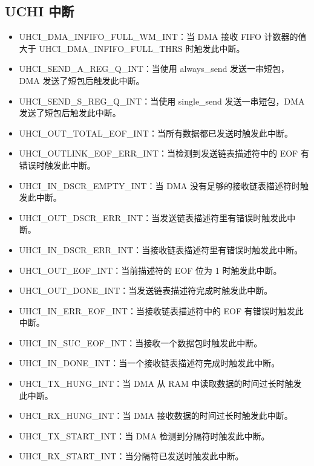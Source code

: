 \documentclass[main\_\_CN.tex]{subfiles}
\begin{document}
\subsection{UCHI 中断}
\begin{itemize}
\item \label{int:UHCIDMAINFIFOFULLWMINT}UHCI\_DMA\_INFIFO\_FULL\_WM\_INT：当 DMA 接收 FIFO 计数器的值大于 UHCI\_DMA\_INFIFO\_FULL\_THRS 时触发此中断。
\item \label{int:UHCISENDAREGQINT}UHCI\_SEND\_A\_REG\_Q\_INT：当使用 always\_send 发送一串短包，DMA 发送了短包后触发此中断。
\item \label{int:UHCISENDSREGQINT}UHCI\_SEND\_S\_REG\_Q\_INT：当使用 single\_send 发送一串短包，DMA 发送了短包后触发此中断。
\item \label{int:UHCIOUTTOTALEOFINT}UHCI\_OUT\_TOTAL\_EOF\_INT：当所有数据都已发送时触发此中断。
\item \label{int:UHCIOUTLINKEOFERRINT}UHCI\_OUTLINK\_EOF\_ERR\_INT：当检测到发送链表描述符中的 EOF 有错误时触发此中断。
\item \label{int:UHCIINDSCREMPTYINT}UHCI\_IN\_DSCR\_EMPTY\_INT：当 DMA 没有足够的接收链表描述符时触发此中断。
\item \label{int:UHCIOUTDSCRERRINT}UHCI\_OUT\_DSCR\_ERR\_INT：当发送链表描述符里有错误时触发此中断。
\item \label{int:UHCIINDSCRERRINT}UHCI\_IN\_DSCR\_ERR\_INT：当接收链表描述符里有错误时触发此中断。
\item \label{int:UHCIOUTEOFINT}UHCI\_OUT\_EOF\_INT：当前描述符的 EOF 位为 1 时触发此中断。
\item \label{int:UHCIOUTDONEINT}UHCI\_OUT\_DONE\_INT：当发送链表描述符完成时触发此中断。
\item \label{int:UHCIINERREOFINT}UHCI\_IN\_ERR\_EOF\_INT：当接收链表描述符中的 EOF 有错误时触发此中断。
\item \label{int:UHCIINSUCEOFINT}UHCI\_IN\_SUC\_EOF\_INT：当接收一个数据包时触发此中断。
\item \label{int:UHCIINDONEINT}UHCI\_IN\_DONE\_INT：当一个接收链表描述符完成时触发此中断。
\item \label{int:UHCITXHUNGINT}UHCI\_TX\_HUNG\_INT：当 DMA 从 RAM 中读取数据的时间过长时触发此中断。
\item \label{int:UHCIRXHUNGINT}UHCI\_RX\_HUNG\_INT：当 DMA 接收数据的时间过长时触发此中断。
\item \label{int:UHCITXSTARTINT}UHCI\_TX\_START\_INT：当 DMA 检测到分隔符时触发此中断。
\item \label{int:UHCIRXSTARTINT}UHCI\_RX\_START\_INT：当分隔符已发送时触发此中断。
\end{itemize}
\end{document}
